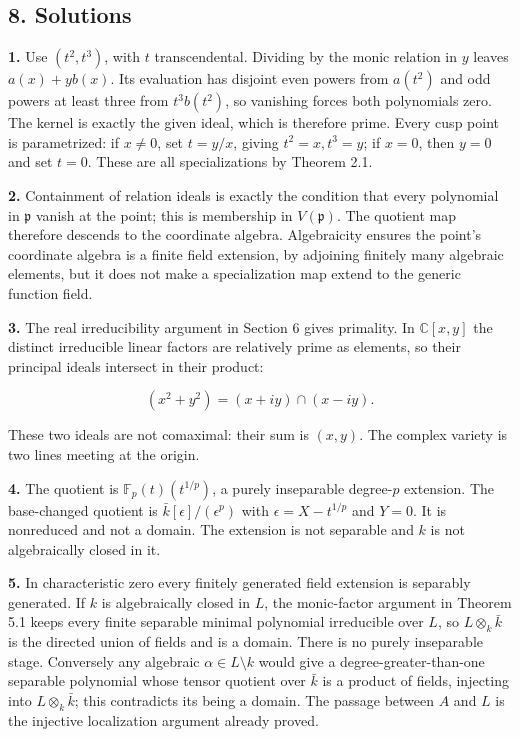 \documentclass[
]{article}
\begin{document}
\subsection{8. Solutions}\label{solutions}

\textbf{1.} Use \((t^2,t^3)\), with \(t\) transcendental. Dividing by
the monic relation in \(y\) leaves \(a(x)+yb(x)\). Its evaluation has
disjoint even powers from \(a(t^2)\) and odd powers at least three from
\(t^3b(t^2)\), so vanishing forces both polynomials zero. The kernel is
exactly the given ideal, which is therefore prime. Every cusp point is
parametrized: if \(x\ne0\), set \(t=y/x\), giving \(t^2=x,t^3=y\); if
\(x=0\), then \(y=0\) and set \(t=0\). These are all specializations by
Theorem 2.1.

\textbf{2.} Containment of relation ideals is exactly the condition that
every polynomial in \(\mathfrak p\) vanish at the point; this is
membership in \(V(\mathfrak p)\). The quotient map therefore descends to
the coordinate algebra. Algebraicity ensures the point's coordinate
algebra is a finite field extension, by adjoining finitely many
algebraic elements, but it does not make a specialization map extend to
the generic function field.

\textbf{3.} The real irreducibility argument in Section 6 gives
primality. In \(\mathbb C[x,y]\) the distinct irreducible linear factors
are relatively prime as elements, so their principal ideals intersect in
their product:

\[
(x^2+y^2)=(x+iy)\cap(x-iy).
\]

These two ideals are not comaximal: their sum is \((x,y)\). The complex
variety is two lines meeting at the origin.

\textbf{4.} The quotient is \(\mathbb F_p(t)(t^{1/p})\), a purely
inseparable degree-\(p\) extension. The base-changed quotient is
\(\bar k[\epsilon]/(\epsilon^p)\) with \(\epsilon=X-t^{1/p}\) and
\(Y=0\). It is nonreduced and not a domain. The extension is not
separable and \(k\) is not algebraically closed in it.

\textbf{5.} In characteristic zero every finitely generated field
extension is separably generated. If \(k\) is algebraically closed in
\(L\), the monic-factor argument in Theorem 5.1 keeps every finite
separable minimal polynomial irreducible over \(L\), so
\(L\otimes_k\bar k\) is the directed union of fields and is a domain.
There is no purely inseparable stage. Conversely any algebraic
\(\alpha\in L\setminus k\) would give a degree-greater-than-one
separable polynomial whose tensor quotient over \(\bar k\) is a product
of fields, injecting into \(L\otimes_k\bar k\); this contradicts its
being a domain. The passage between \(A\) and \(L\) is the injective
localization argument already proved.
\end{document}
